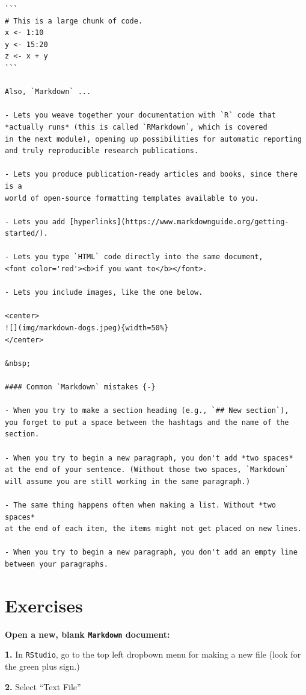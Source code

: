 \documentclass[]{book}
\begin{document}
\begin{verbatim}
```
# This is a large chunk of code. 
x <- 1:10
y <- 15:20
z <- x + y
```

Also, `Markdown` ...  

- Lets you weave together your documentation with `R` code that
*actually runs* (this is called `RMarkdown`, which is covered
in the next module), opening up possibilities for automatic reporting
and truly reproducible research publications.  

- Lets you produce publication-ready articles and books, since there is a
world of open-source formatting templates available to you.  

- Lets you add [hyperlinks](https://www.markdownguide.org/getting-started/).  

- Lets you type `HTML` code directly into the same document, 
<font color='red'><b>if you want to</b></font>. 

- Lets you include images, like the one below.  

<center>
![](img/markdown-dogs.jpeg){width=50%}
</center>

&nbsp;  

#### Common `Markdown` mistakes {-}

- When you try to make a section heading (e.g., `## New section`),
you forget to put a space between the hashtags and the name of the section.  

- When you try to begin a new paragraph, you don't add *two spaces*
at the end of your sentence. (Without those two spaces, `Markdown`
will assume you are still working in the same paragraph.) 

- The same thing happens often when making a list. Without *two spaces*
at the end of each item, the items might not get placed on new lines.  

- When you try to begin a new paragraph, you don't add an empty line
between your paragraphs.  
\end{verbatim}

\hypertarget{exercises-12}{%
\section*{Exercises}\label{exercises-12}}

\textbf{Open a new, blank \texttt{Markdown} document:}

\textbf{1.} In \texttt{RStudio}, go to the top left dropbown menu for making a new file (look for the green plus sign.)

\textbf{2.} Select ``Text File''
\end{document}

